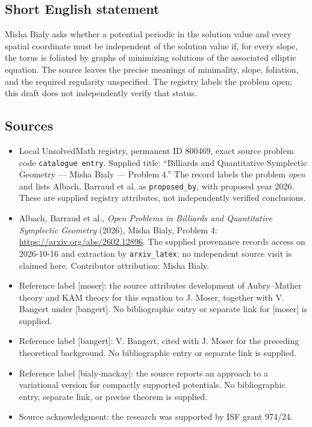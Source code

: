 \documentclass[11pt]{article}
\begin{document}
\subsection{Short English statement}
Misha Bialy asks whether a potential periodic in the solution value and every spatial coordinate must be independent of the solution value if, for every slope, the torus is foliated by graphs of minimizing solutions of the associated elliptic equation. The source leaves the precise meanings of minimality, slope, foliation, and the required regularity unspecified. The registry labels the problem open; this draft does not independently verify that status.
\subsection{Sources}
\begin{itemize}
\item Local UnsolvedMath registry, permanent ID \(800469\), exact source problem code \texttt{catalogue entry}. Supplied title: ``Billiards and Quantitative Symplectic Geometry --- Misha Bialy --- Problem 4.'' The record labels the problem \emph{open} and lists Albach, Barraud et al. as \texttt{proposed\_by}, with proposed year 2026. These are supplied registry attributes, not independently verified conclusions.
\item Albach, Barraud et al., \emph{Open Problems in Billiards and Quantitative Symplectic Geometry} (2026), Misha Bialy, Problem 4: \url{https://arxiv.org/abs/2602.12896}. The supplied provenance records access on 2026-10-16 and extraction by \texttt{arxiv\_latex}; no independent source visit is claimed here. Contributor attribution: Misha Bialy.
\item Reference label [moser]: the source attributes development of Aubry--Mather theory and KAM theory for this equation to J. Moser, together with V. Bangert under [bangert]. No bibliographic entry or separate link for [moser] is supplied.
\item Reference label [bangert]: V. Bangert, cited with J. Moser for the preceding theoretical background. No bibliographic entry or separate link is supplied.
\item Reference label [bialy-mackay]: the source reports an approach to a variational version for compactly supported potentials. No bibliographic entry, separate link, or precise theorem is supplied.
\item Source acknowledgment: the research was supported by ISF grant 974/24.
\end{itemize}
\end{document}
